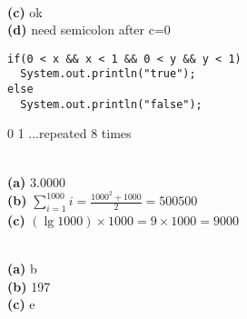 \documentclass[10pt,a4paper]{article}
\newenvironment{problem}[2][Problem]{\begin{trivlist}
	\item[\hskip \labelsep {\bfseries #1}\hskip \labelsep {\bfseries #2}]}{\end{trivlist}}
\renewcommand\part[1]{\vspace{.10in}\textbf{\\(#1)}}
\begin{document}
\part{c} ok
\part{d} need semicolon after c=0

\begin{problem}{1.1.5}
\end{problem}

\begin{verbatim}
if(0 < x && x < 1 && 0 < y && y < 1)
  System.out.println("true");
else
  System.out.println("false");
\end{verbatim}

\begin{problem}{1.1.6}
\end{problem}

0
1
...repeated 8 times

\begin{problem}{1.1.7}
\end{problem}

\part{a} 3.0000
\part{b} \( \sum\limits_{i=1}^{1000} i = \frac{1000^2 + 1000}{2} = 500500 \)
\part{c} \( (\lg 1000)  \times 1000 = 9 \times 1000 = 9000\)

\begin{problem}{1.1.8}
\end{problem}

\part{a} b
\part{b} 197
\part{c} e

\begin{problem}{1.1.9}
\end{problem}
\end{document}
